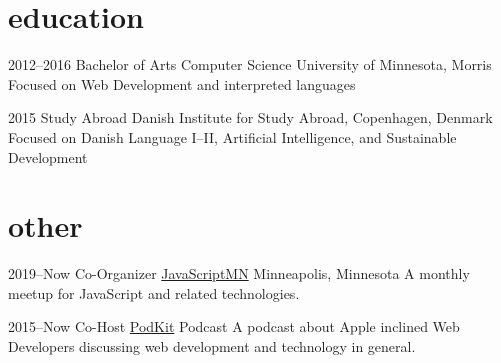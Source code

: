 \documentclass[]{cv-style} %
\begin{document}

\section{education}

\begin{entrylist}


\entry
{2012--2016}
{Bachelor of Arts {\normalfont Computer Science}}
{University of Minnesota, Morris}
{\small{Focused on Web Development and interpreted languages}}

\entry
{2015}
{Study Abroad}
{Danish Institute for Study Abroad, Copenhagen, Denmark}
{\small{Focused on Danish Language I--II, Artificial Intelligence, and Sustainable Development}}


\end{entrylist}


\section{other}

\begin{entrylist}


\entry
{2019--Now}
{Co-Organizer {\normalfont \href{https://javascriptmn.com}{JavaScriptMN}}}
{Minneapolis, Minnesota}
{A monthly meetup for JavaScript and related technologies.}


\entry
{2015--Now}
{Co-Host {\normalfont \href{http://thenexus.tv/category/pk/}{PodKit}}}
{Podcast}
{A podcast about Apple inclined Web Developers discussing web development and technology in general.}


\end{entrylist}


%
%
%
%
%
\end{document}
